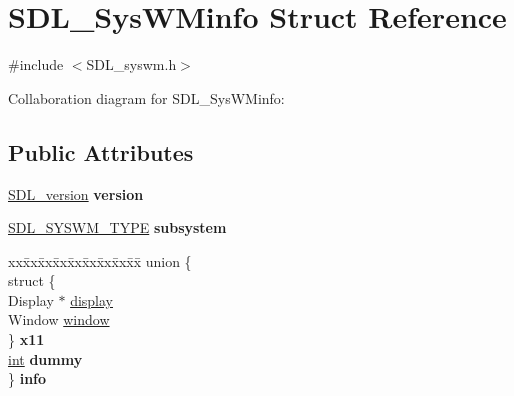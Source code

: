 \hypertarget{struct_s_d_l___sys_w_minfo}{}\section{S\+D\+L\+\_\+\+Sys\+W\+Minfo Struct Reference}
\label{struct_s_d_l___sys_w_minfo}


{\ttfamily \#include $<$S\+D\+L\+\_\+syswm.\+h$>$}



Collaboration diagram for S\+D\+L\+\_\+\+Sys\+W\+Minfo\+:
\subsection*{Public Attributes}
\begin{DoxyCompactItemize}
\item 
\hypertarget{struct_s_d_l___sys_w_minfo_ac3a70af022d4849e9ff546595e94627f}{}\hyperlink{struct_s_d_l__version}{S\+D\+L\+\_\+version} {\bfseries version}\label{struct_s_d_l___sys_w_minfo_ac3a70af022d4849e9ff546595e94627f}

\item 
\hypertarget{struct_s_d_l___sys_w_minfo_a438b6a06ab3ee417293c7b7fc5a23855}{}\hyperlink{_s_d_l__syswm_8h_a064c26598287280fff2a00d6758ac4f7}{S\+D\+L\+\_\+\+S\+Y\+S\+W\+M\+\_\+\+T\+Y\+P\+E} {\bfseries subsystem}\label{struct_s_d_l___sys_w_minfo_a438b6a06ab3ee417293c7b7fc5a23855}

\item 
\hypertarget{struct_s_d_l___sys_w_minfo_a0d45770bb3e40b508aa46e36b9e96c6b}{}\begin{tabbing}
xx\=xx\=xx\=xx\=xx\=xx\=xx\=xx\=xx\=\kill
union \{\\
\>struct \{\\
\>\>Display $\ast$ \hyperlink{struct_s_d_l___sys_w_minfo_a58ef8bc8e1065e95e75a08d08f4a4741}{display}\\
\>\>Window \hyperlink{struct_s_d_l___sys_w_minfo_a83ca4b0f4bdf67a0edee03d5bde86b93}{window}\\
\>\} {\bfseries x11}\\
\>\hyperlink{_s_d_l__thread_8h_a6a64f9be4433e4de6e2f2f548cf3c08e}{int} {\bfseries dummy}\\
\} {\bfseries info}\label{struct_s_d_l___sys_w_minfo_a0d45770bb3e40b508aa46e36b9e96c6b}
\\

\end{tabbing}\end{DoxyCompactItemize}


